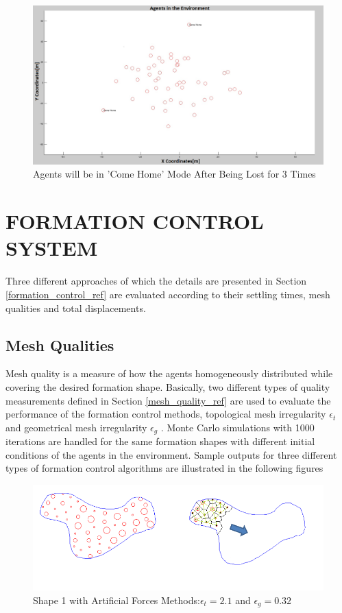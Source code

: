\begin{figure}[H]
\captionsetup{format=hang,justification=centerfirst}
\caption{Agents will be in 'Come Home' Mode After Being Lost for 3 Times} \label{come_home_ref}
\centerline{\includegraphics[scale = 0.25]{Lost-2-3}}
\end{figure} 		
		
\section{FORMATION CONTROL SYSTEM}
Three different approaches of which the details are presented in Section \ref{formation_control_ref} are evaluated according to their settling times, mesh qualities and total displacements. 

\subsection{Mesh Qualities} 
Mesh quality is a measure of how the agents homogeneously distributed while covering the desired formation shape. Basically, two different types of quality measurements defined in Section \ref{mesh_quality_ref} are used to evaluate the performance of the formation control methods, topological mesh irregularity $\epsilon_t$ and geometrical mesh irregularity $\epsilon_g$ . Monte Carlo simulations with 1000 iterations are handled for the same formation shapes with different initial conditions of the agents in the environment. Sample outputs for three different types of formation control algorithms are illustrated in the following figures
  
\begin{figure}[H]
\caption{Shape 1 with Artificial Forces Methods:$\epsilon_t = 2.1$ and $\epsilon_g = 0.32$}
\centerline{\includegraphics[scale = 0.70]{Artificial_Forces_Mesh_1}}
\end{figure} 		
		
